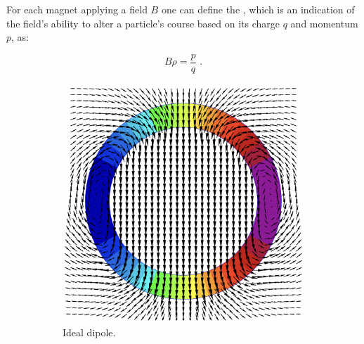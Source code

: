 For each magnet applying a field \(B\) one can define the , which is an indication of the field's ability to alter a particle's course based on its charge \(q\) and momentum \(p\), as:

\begin{equation}
    B \rho = \frac{p}{q} \text{ .}
    \label{equation:magnetic_rigidity}
\end{equation}

\begin{figure}[!hbt]
    \centering
    \begin{subfigure}[b]{0.45\textwidth}
        \centering
        \includegraphics[width=\textwidth]{Figures/Beam_Dynamics_Theory/ideal_dipole_cos_theta.png}
        \caption{Ideal dipole.}
        \label{fig:ideal_dipole}
    \end{subfigure}
    \hfill
    \begin{subfigure}[b]{0.45\textwidth}
        \centering

\end{subfigure}
\end{figure}
